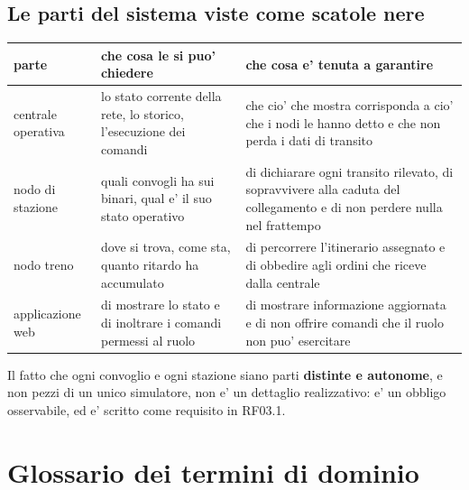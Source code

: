 \documentclass[11pt]{article}
\begin{document}
\subsection{Le parti del sistema viste come scatole nere}
\label{sec:org0fc7ea0}

\begin{center}
\begin{tabular}{|p{}|p{}|p{}|}
parte & che cosa le si puo' chiedere & che cosa e' tenuta a garantire\\
\hline
centrale operativa & lo stato corrente della rete, lo storico, l'esecuzione dei comandi & che cio' che mostra corrisponda a cio' che i nodi le hanno detto e che non perda i dati di transito\\
nodo di stazione & quali convogli ha sui binari, qual e' il suo stato operativo & di dichiarare ogni transito rilevato, di sopravvivere alla caduta del collegamento e di non perdere nulla nel frattempo\\
nodo treno & dove si trova, come sta, quanto ritardo ha accumulato & di percorrere l'itinerario assegnato e di obbedire agli ordini che riceve dalla centrale\\
applicazione web & di mostrare lo stato e di inoltrare i comandi permessi al ruolo & di mostrare informazione aggiornata e di non offrire comandi che il ruolo non puo' esercitare\\
\end{tabular}
\end{center}

Il fatto che ogni convoglio e ogni stazione siano parti \textbf{distinte e autonome}, e non pezzi di un
unico simulatore, non e' un dettaglio realizzativo: e' un obbligo osservabile, ed e' scritto come
requisito in RF03.1.
\section{Glossario dei termini di dominio}
\label{sec:org18464b4}
\end{document}
